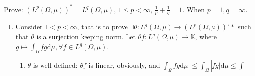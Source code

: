 \documentclass{ctexart}
\newif\ifpreface
\begin{document}
\large
\setlength{\baselineskip}{1.2em}
\ifpreface
    
\else
\maketitle
\fi
{}
\begin{problem}
  Prove: \((L^{p} (\Omega, \mu))^* = L^q (\Omega, \mu)\), \(1 \leq p < \infty \), \( \frac{1}{p}+ \frac{1}{q} = 1\).
  When \(p = 1, q = \infty\).
\end{problem}
\begin{solution}
  \begin{enumerate}
    \item Consider \( 1 < p < \infty\), that is to prove \( \exists \theta : L^q(\Omega , \mu) \to (L^{p}(\Omega, \mu))'*\) such that
      \(\theta\) is a surjection keeping norm.
      Let \(\theta f : L^{q}(\Omega, \mu) \to \mathbb{K}\), where \(g \mapsto \int _{\Omega} f g \mathrm{d}\mu, \forall f \in L^{q}(\Omega, \mu)\).
      \begin{enumerate}
        \item \(\theta\) is well-defined: \(\theta f \) is linear, obviously, and \(
          \int_{\Omega} f g \mathrm{d} \mu| \leq  \int_{\Omega}|f g | \mathrm{d} \mu \leq \int_{} \)
      \end{enumerate}
  \end{enumerate}
\end{solution}
\end{document}
